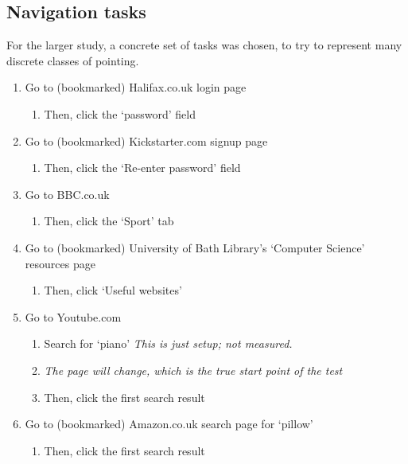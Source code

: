 \documentclass[11pt,openright,a4paper]{report}
\begin{document}
\subsection{Navigation tasks}
For the larger study, a concrete set of tasks was chosen, to try to represent many discrete classes of pointing.

\begin{enumerate}
\item Go to (bookmarked) Halifax.co.uk login page
	\begin{enumerate}
        \item Then, click the `password' field
    \end{enumerate}
	
\item Go to (bookmarked) Kickstarter.com signup page
	\begin{enumerate}
		\item Then, click the `Re-enter password' field
	\end{enumerate}
	
\item Go to BBC.co.uk
	\begin{enumerate}
		\item Then, click the `Sport' tab
	\end{enumerate}

\item Go to (bookmarked) University of Bath Library's `Computer Science' resources page
	\begin{enumerate}
		\item Then, click `Useful websites'
	\end{enumerate}

\item Go to Youtube.com
	\begin{enumerate}
		\item Search for `piano' \textit{This is just setup; not measured.}
		\item \textit{The page will change, which is the true start point of the test}
		\item Then, click the first search result
	\end{enumerate}

\item Go to (bookmarked) Amazon.co.uk search page for `pillow'
	\begin{enumerate}
		\item Then, click the first search result
	\end{enumerate}


\end{enumerate}
\end{document}
